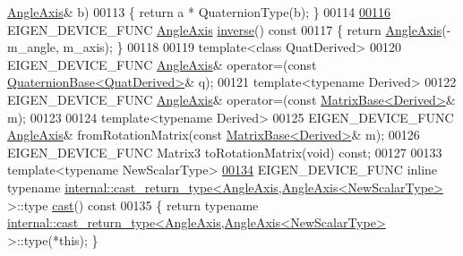 \begin{DoxyCode}
      \hyperlink{group___geometry___module_class_eigen_1_1_angle_axis}{AngleAxis}& b)
00113   \{ \textcolor{keywordflow}{return} a * QuaternionType(b); \}
00114 
\hyperlink{group___geometry___module_a915c92f43b1a6103762d0d0d059748fb}{00116}   EIGEN\_DEVICE\_FUNC \hyperlink{group___geometry___module_class_eigen_1_1_angle_axis}{AngleAxis} \hyperlink{group___geometry___module_a915c92f43b1a6103762d0d0d059748fb}{inverse}()\textcolor{keyword}{ const}
00117 \textcolor{keyword}{  }\{ \textcolor{keywordflow}{return} \hyperlink{group___geometry___module_class_eigen_1_1_angle_axis}{AngleAxis}(-m\_angle, m\_axis); \}
00118 
00119   \textcolor{keyword}{template}<\textcolor{keyword}{class} QuatDerived>
00120   EIGEN\_DEVICE\_FUNC \hyperlink{group___geometry___module_class_eigen_1_1_angle_axis}{AngleAxis}& operator=(\textcolor{keyword}{const} 
      \hyperlink{group___geometry___module_class_eigen_1_1_quaternion_base}{QuaternionBase<QuatDerived>}& q);
00121   \textcolor{keyword}{template}<\textcolor{keyword}{typename} Derived>
00122   EIGEN\_DEVICE\_FUNC \hyperlink{group___geometry___module_class_eigen_1_1_angle_axis}{AngleAxis}& operator=(\textcolor{keyword}{const} \hyperlink{group___core___module_class_eigen_1_1_matrix_base}{MatrixBase<Derived>}& m);
00123 
00124   \textcolor{keyword}{template}<\textcolor{keyword}{typename} Derived>
00125   EIGEN\_DEVICE\_FUNC \hyperlink{group___geometry___module_class_eigen_1_1_angle_axis}{AngleAxis}& fromRotationMatrix(\textcolor{keyword}{const} 
      \hyperlink{group___core___module_class_eigen_1_1_matrix_base}{MatrixBase<Derived>}& m);
00126   EIGEN\_DEVICE\_FUNC Matrix3 toRotationMatrix(\textcolor{keywordtype}{void}) \textcolor{keyword}{const};
00127 
00133   \textcolor{keyword}{template}<\textcolor{keyword}{typename} NewScalarType>
\hyperlink{group___geometry___module_a4baeb843025af6b4ce76e9a29cc08988}{00134}   EIGEN\_DEVICE\_FUNC \textcolor{keyword}{inline} \textcolor{keyword}{typename} 
      \hyperlink{struct_eigen_1_1internal_1_1cast__return__type}{internal::cast\_return\_type<AngleAxis,AngleAxis<NewScalarType>}
       >::type \hyperlink{group___geometry___module_a4baeb843025af6b4ce76e9a29cc08988}{cast}()\textcolor{keyword}{ const}
00135 \textcolor{keyword}{  }\{ \textcolor{keywordflow}{return} \textcolor{keyword}{typename} 
      \hyperlink{struct_eigen_1_1internal_1_1cast__return__type}{internal::cast\_return\_type<AngleAxis,AngleAxis<NewScalarType>}
       >::type(*\textcolor{keyword}{this}); \}

\end{DoxyCode}
